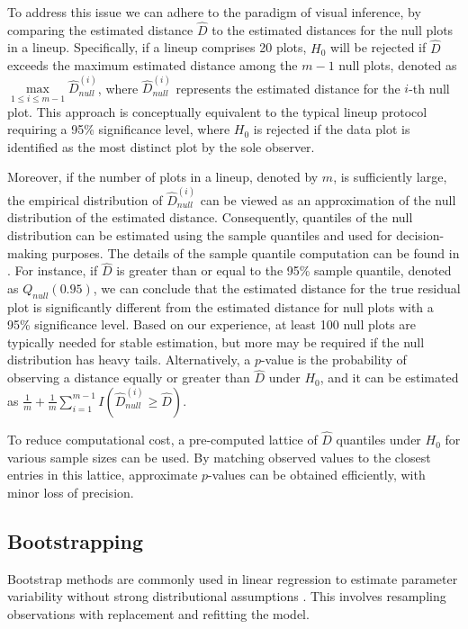 \documentclass[]{interact}
\theoremstyle{plain}%
\theoremstyle{definition}
\theoremstyle{remark}
\begin{document}
To address this issue we can adhere to the paradigm of visual inference,
by comparing the estimated distance \(\hat{D}\) to the estimated
distances for the null plots in a lineup. Specifically, if a lineup
comprises 20 plots, \(H_0\) will be rejected if \(\hat{D}\) exceeds the
maximum estimated distance among the \(m - 1\) null plots, denoted as
\(\max\limits_{1 \leq i \leq m-1} {\hat{D}_{null}^{(i)}}\), where
\(\hat{D}_{null}^{(i)}\) represents the estimated distance for the
\(i\)-th null plot. This approach is conceptually equivalent to the
typical lineup protocol requiring a 95\% significance level, where
\(H_0\) is rejected if the data plot is identified as the most distinct
plot by the sole observer.

Moreover, if the number of plots in a lineup, denoted by \(m\), is
sufficiently large, the empirical distribution of
\({\hat{D}_{null}^{(i)}}\) can be viewed as an approximation of the null
distribution of the estimated distance. Consequently, quantiles of the
null distribution can be estimated using the sample quantiles and used
for decision-making purposes. The details of the sample quantile
computation can be found in \citet{hyndman1996sample}. For instance, if
\(\hat{D}\) is greater than or equal to the 95\% sample quantile,
denoted as \(Q_{null}(0.95)\), we can conclude that the estimated
distance for the true residual plot is significantly different from the
estimated distance for null plots with a 95\% significance level. Based
on our experience, at least 100 null plots are typically needed for
stable estimation, but more may be required if the null distribution has
heavy tails. Alternatively, a \(p\)-value is the probability of
observing a distance equally or greater than \(\hat{D}\) under \(H_0\),
and it can be estimated as
\(\frac{1}{m} + \frac{1}{m}\sum_{i=1}^{m-1}I\left(\hat{D}_{null}^{(i)} \geq \hat{D}\right)\).

To reduce computational cost, a pre-computed lattice of \(\hat{D}\)
quantiles under \(H_0\) for various sample sizes can be used. By
matching observed values to the closest entries in this lattice,
approximate \(p\)-values can be obtained efficiently, with minor loss of
precision.

\subsection{Bootstrapping}\label{bootstrapping}

Bootstrap methods are commonly used in linear regression to estimate
parameter variability without strong distributional assumptions
\citep{davison1997bootstrap, efron1994introduction}. This involves
resampling observations with replacement and refitting the model.
\end{document}
